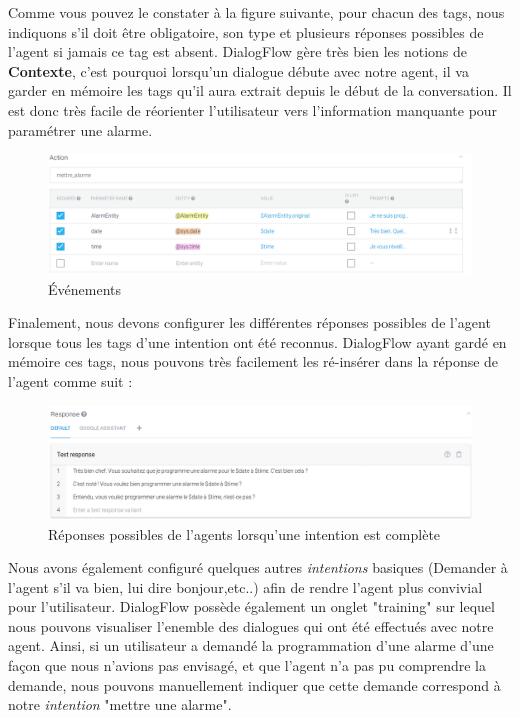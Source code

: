 Comme vous pouvez le constater à la figure suivante, pour chacun des tags, nous indiquons s'il doit être obligatoire, son type et plusieurs réponses possibles de l'agent si jamais ce tag est absent. DialogFlow gère 
très bien les notions de \textbf{Contexte}, c'est pourquoi lorsqu'un dialogue débute avec notre agent, il va garder en mémoire les tags qu'il aura extrait depuis le 
début de la conversation. Il est donc très facile de réorienter l'utilisateur vers l'information manquante pour paramétrer une alarme. 

\begin{figure}[H]
    \centering
        \centering
        \includegraphics[width=1.2\textwidth]{images/action.png}
        \caption{Événements}
\end{figure}

Finalement, nous devons configurer les différentes réponses possibles de l'agent lorsque tous les tags d'une intention ont été reconnus. DialogFlow ayant gardé en mémoire 
ces tags, nous pouvons très facilement les ré-insérer dans la réponse de l'agent comme suit : 

\begin{figure}[H]
    \centering
        \centering
        \includegraphics[width=1.2\textwidth]{images/answer.png}
        \caption{Réponses possibles de l'agents lorsqu'une intention est complète}
\end{figure}

Nous avons également configuré quelques autres \emph{intentions} basiques (Demander à l'agent s'il va bien, lui dire bonjour,etc..) afin de rendre l'agent plus convivial 
pour l'utilisateur. DialogFlow possède également un onglet "training" sur lequel nous pouvons visualiser l'enemble des dialogues qui ont été effectués avec notre agent. Ainsi,
si un utilisateur a demandé la programmation d'une alarme d'une façon que nous n'avions pas envisagé, et que l'agent n'a pas pu comprendre la demande, nous pouvons 
manuellement indiquer que cette demande correspond à notre \emph{intention} "mettre une alarme".

